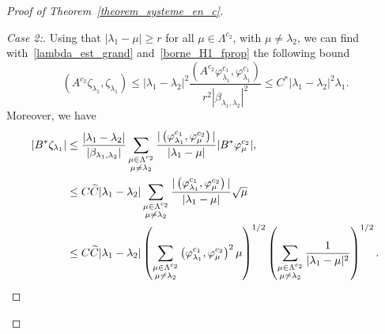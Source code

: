 \documentclass[10pt]{amsart}
\theoremstyle{definition}\newtheorem{defi}[theo]{Definition}\newtheorem{rema}[theo]{Remark}\newtheorem{exam}[theo]{Example}\newtheorem{exem}[theo]{Example}\newtheorem{nota}[theo]{Notation}
\newenvironment{step}[1]{\begin{proof}[#1]}{\let\qed\relax\end{proof}}
\newcommand{\fprop}[2]{\varphi^{#1}_{#2}}
\let\oldtilde\tilde
\renewcommand*{\tilde}[1]{\mathchoice{\widetilde{#1}}{\widetilde{#1}}{\oldtilde{#1}}{\oldtilde{#1}}}\let\oldexists\exists
\renewcommand*{\exists}{\mathrel{\oldexists}}
\begin{document}
\begin{proof}[Proof of Theorem~\ref{theorem_systeme_en_c}]
\begin{step}{Case 2:}
Using that $|\lambda_1-\mu|\geq r$ for all $\mu\in \Lambda^{c_2}$, with $\mu\neq \lambda_2$, we can find with~\eqref{lambda_est_grand} and~\eqref{borne_H1_fprop} the following bound
\begin{equation}\label{borne_chi_lambda1}
\left(A^{c_2} \zeta_{\lambda_1},\zeta_{\lambda_1}\right) \leq |\lambda_1-\lambda_2|^2 \frac{\left(A^{c_2} \fprop{c_1}{\lambda_1}, \fprop{c_1}{\lambda_1}\right)}{r^2|\beta_{\lambda_1,\lambda_2}|^2} \leq C^* |\lambda_1-\lambda_2|^2 \lambda_1.
\end{equation}
Moreover, we have
\begin{align*}
|B^* \zeta_{\lambda_1}| & \leq \frac{|\lambda_1-\lambda_2|}{|\beta_{\lambda_1,\lambda_2}|} \sum_{\substack{\mu\in \Lambda^{c_2}\\ \mu\neq \lambda_2}} \frac{|\left(\fprop{c_1}{\lambda_1}, \fprop{c_2}{\mu}\right)|}{|\lambda_1-\mu|} |B^* \fprop{c_2}{\mu}|, \\
& \leq C \tilde{C} |\lambda_1-\lambda_2| \sum_{\substack{\mu\in \Lambda^{c_2}\\ \mu\neq \lambda_2}} \frac{|\left(\fprop{c_1}{\lambda_1}, \fprop{c_2}{\mu}\right)|}{|\lambda_1-\mu|} \sqrt{\mu} \\
& \leq C \tilde{C} |\lambda_1-\lambda_2| \left(\sum_{\substack{\mu\in \Lambda^{c_2}\\ \mu\neq \lambda_2}} \left(\fprop{c_1}{\lambda_1}, \fprop{c_2}{\mu}\right)^2\mu \right)^{1/2} \left(\sum_{\substack{\mu\in \Lambda^{c_2}\\ \mu\neq \lambda_2}} \frac{1}{|\lambda_1-\mu|^2} \right)^{1/2}.
\end{align*}


\end{step}
\end{proof}
\end{document}
